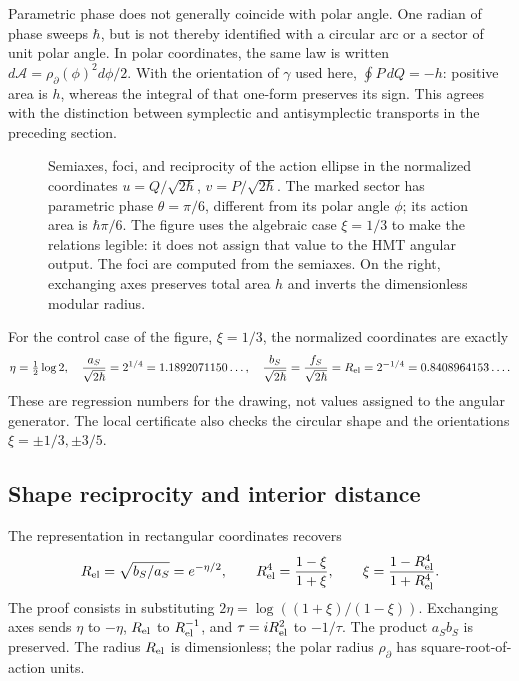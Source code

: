Parametric phase does not generally coincide with polar angle. One radian
of phase sweeps \(\hbar\), but is not thereby identified with a circular
arc or a sector of unit polar angle. In polar coordinates,
the same law is written
\(d\mathcal A=\rho_{\partial}(\phi)^2d\phi/2\).
With the orientation of \(\gamma\) used here,
\(\oint P\,dQ=-h\): positive area is \(h\), whereas the
integral of that one-form preserves its sign. This agrees with the
distinction between symplectic and antisymplectic transports in the
preceding section.

\begin{figure}[htbp]
 \centering
 
 \caption{Semiaxes, foci, and reciprocity of the action ellipse in the
 normalized coordinates \(u=Q/\sqrt{2\hbar}\),
 \(v=P/\sqrt{2\hbar}\). The marked sector has parametric phase
 \(\theta=\pi/6\), different from its polar angle \(\phi\); its action
 area is \(\hbar\pi/6\). The figure uses the algebraic case
 \(\xi=1/3\) to make the relations legible: it does not assign that value
 to the HMT angular output. The foci are computed from the semiaxes.
 On the right, exchanging axes preserves total area \(h\)
 and inverts the dimensionless modular radius.}
 \label{fig:ii-elipse-calculada}
\end{figure}

For the control case of the figure, \(\xi=1/3\), the normalized
coordinates are exactly
\[
 \eta=\tfrac12\log2,\quad
 \frac{a_S}{\sqrt{2\hbar}}=2^{1/4}=1.1892071150\ldots,\quad
 \frac{b_S}{\sqrt{2\hbar}}=
 \frac{f_S}{\sqrt{2\hbar}}=R_{\rm el}=2^{-1/4}=0.8408964153\ldots.
\]
These are regression numbers for the drawing, not values assigned to the angular
generator. The local certificate also checks the circular shape and
the orientations \(\xi=\pm1/3,\pm3/5\).

\subsection{Shape reciprocity and interior distance}

The representation in rectangular coordinates recovers
\begin{equation}
 R_{\rm el}=\sqrt{b_S/a_S}=e^{-\eta/2},\qquad
 R_{\rm el}^4=\frac{1-\xi}{1+\xi},\qquad
 \xi=\frac{1-R_{\rm el}^4}{1+R_{\rm el}^4}.
 \label{eq:ii-elipse-reciproca}
\end{equation}
The proof consists in substituting
\(2\eta=\log((1+\xi)/(1-\xi))\). Exchanging axes
sends \(\eta\) to \(-\eta\), \(R_{\rm el}\) to
\(R_{\rm el}^{-1}\), and \(\tau=iR_{\rm el}^2\) to \(-1/\tau\).
The product \(a_Sb_S\) is preserved. The radius \(R_{\rm el}\) is dimensionless;
the polar radius \(\rho_{\partial}\) has square-root-of-action units.

